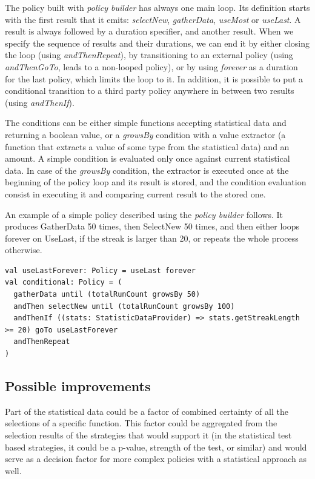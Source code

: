 The policy built with \textit{policy builder} has always one main loop. Its definition starts with the first result that it emits: \textit{selectNew}, \textit{gatherData}, \textit{useMost} or \textit{useLast}. A result is always followed by a duration specifier, and another result. When we specify the sequence of results and their durations, we can end it by either closing the loop (using \textit{andThenRepeat}), by transitioning to an external policy (using \textit{andThenGoTo}, leads to a non-looped policy), or by using \textit{forever} as a duration for the last policy, which limits the loop to it. In addition, it is possible to put a conditional transition to a third party policy anywhere in between two results (using \textit{andThenIf}).

The conditions can be either simple functions accepting statistical data and returning a boolean value, or a \textit{growsBy} condition with a value extractor (a function that extracts a value of some type from the statistical data) and an amount. A simple condition is evaluated only once against current statistical data. In case of the \textit{growsBy} condition, the extractor is executed once at the beginning of the policy loop and its result is stored, and the condition evaluation consist in executing it and comparing current result to the stored one.

An example of a simple policy described using the \textit{policy builder} follows. It produces GatherData 50 times, then SelectNew 50 times, and then either loops forever on UseLast, if the streak is larger than 20, or repeats the whole process otherwise.

\lstset{style=Scala}
\begin{lstlisting}
val useLastForever: Policy = useLast forever
val conditional: Policy = (
  gatherData until (totalRunCount growsBy 50)
  andThen selectNew until (totalRunCount growsBy 100)
  andThenIf ((stats: StatisticDataProvider) => stats.getStreakLength >= 20) goTo useLastForever
  andThenRepeat
)
\end{lstlisting}

\subsection{Possible improvements}
\label{subsec:policy_improvements}

Part of the statistical data could be a factor of combined certainty of all the selections of a specific function. This factor could be aggregated from the selection results of the strategies that would support it (in the statistical test based strategies, it could be a p-value, strength of the test, or similar) and would serve as a decision factor for more complex policies with a statistical approach as well.

